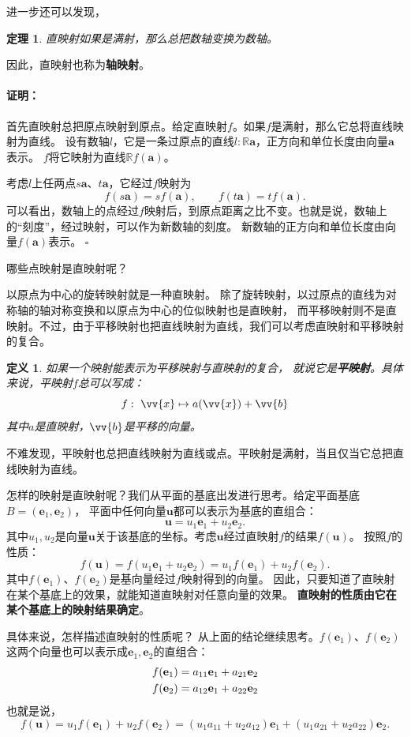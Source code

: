 \documentclass[12pt,UTF8]{ctexbook}
\newtheorem{df}{定义}[section]
\newtheorem{tm}{定理}[section]
\renewenvironment{proof}{\paragraph{\textbf{证明：}}}{\hfill$\square$}
\begin{document}
进一步还可以发现，
\begin{tm}
    直映射如果是满射，那么总把数轴变换为数轴。
\end{tm}
因此，直映射也称为\textbf{轴映射}。
\begin{proof}
    首先直映射总把原点映射到原点。给定直映射$f$。如果$f$是满射，那么它总将直线映射为直线。
    设有数轴$l$，它是一条过原点的直线$l: \mathbb{R}\mathbf{a}$，正方向和单位长度由向量$\mathbf{a}$表示。
    $f$将它映射为直线$\mathbb{R}f(\mathbf{a})$。

    考虑$l$上任两点$s\mathbf{a}$、$t\mathbf{a}$，它经过$f$映射为
    $$ f(s\mathbf{a}) = sf(\mathbf{a}),\qquad f(t\mathbf{a}) = tf(\mathbf{a}).$$
    可以看出，数轴上的点经过$f$映射后，到原点距离之比不变。也就是说，数轴上的“刻度”，经过映射，可以作为新数轴的刻度。
    新数轴的正方向和单位长度由向量$f(\mathbf{a})$表示。
\end{proof}

哪些点映射是直映射呢？

以原点为中心的旋转映射就是一种直映射。
除了旋转映射，以过原点的直线为对称轴的轴对称变换和以原点为中心的位似映射也是直映射，
而平移映射则不是直映射。不过，由于平移映射也把直线映射为直线，我们可以考虑直映射和平移映射的复合。

\begin{df}
    如果一个映射能表示为平移映射与直映射的复合，
    就说它是\textbf{平映射}。具体来说，平映射$f$总可以写成：
    $$ f: \,\, \vv{x} \mapsto a(\vv{x}) + \vv{b} $$
    其中$a$是直映射，$\vv{b}$是平移的向量。
\end{df}
不难发现，平映射也总把直线映射为直线或点。平映射是满射，当且仅当它总把直线映射为直线。

怎样的映射是直映射呢？我们从平面的基底出发进行思考。给定平面基底$B = (\mathbf{e}_1, \mathbf{e}_2)$，
平面中任何向量$\mathbf{u}$都可以表示为基底的直组合：
$$ \mathbf{u} = u_1 \mathbf{e}_1 + u_2 \mathbf{e}_2.$$
其中$u_1, u_2$是向量$\mathbf{u}$关于该基底的坐标。考虑$\mathbf{u}$经过直映射$f$的结果$f(\mathbf{u})$。
按照$f$的性质：
$$ f(\mathbf{u}) = f(u_1 \mathbf{e}_1 + u_2 \mathbf{e}_2) = u_1 f(\mathbf{e}_1) + u_2 f(\mathbf{e}_2).$$
其中$f(\mathbf{e}_1)$、$f(\mathbf{e}_2)$是基向量经过$f$映射得到的向量。
因此，只要知道了直映射在某个基底上的效果，就能知道直映射对任意向量的效果。
\textbf{直映射的性质由它在某个基底上的映射结果确定}。

具体来说，怎样描述直映射的性质呢？
从上面的结论继续思考。$f(\mathbf{e}_1)$、$f(\mathbf{e}_2)$这两个向量也可以表示成$\mathbf{e}_1, \mathbf{e}_2$的直组合：
\begin{align}
    f(\mathbf{e}_1) &= a_{11} \mathbf{e}_1 + a_{21} \mathbf{e}_2 \notag \\
    f(\mathbf{e}_2) &= a_{12} \mathbf{e}_1 + a_{22} \mathbf{e}_2 \notag
\end{align}
也就是说，
$$ f(\mathbf{u}) = u_1 f(\mathbf{e}_1) + u_2 f(\mathbf{e}_2) = (u_1a_{11} + u_2a_{12}) \mathbf{e}_1 + (u_1a_{21} + u_2a_{22}) \mathbf{e}_2.$$
\end{document}

